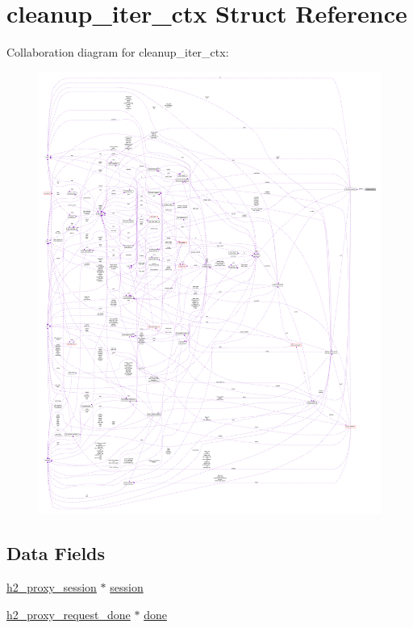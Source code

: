 \hypertarget{structcleanup__iter__ctx}{}\section{cleanup\+\_\+iter\+\_\+ctx Struct Reference}
\label{structcleanup__iter__ctx}


Collaboration diagram for cleanup\+\_\+iter\+\_\+ctx\+:
\nopagebreak
\begin{figure}[H]
\begin{center}
\leavevmode
\includegraphics[width=350pt]{structcleanup__iter__ctx__coll__graph}
\end{center}
\end{figure}
\subsection*{Data Fields}
\begin{DoxyCompactItemize}
\item 
\hyperlink{structh2__proxy__session}{h2\+\_\+proxy\+\_\+session} $\ast$ \hyperlink{structcleanup__iter__ctx_a415be96abc49c1129d0f200e529302b9}{session}
\item 
\hyperlink{h2__proxy__session_8h_ab03f2c17fec6ec68916d7cf8a91efd54}{h2\+\_\+proxy\+\_\+request\+\_\+done} $\ast$ \hyperlink{structcleanup__iter__ctx_a682d37e24a1c99450d93ee0d09329ffd}{done}
\end{DoxyCompactItemize}


